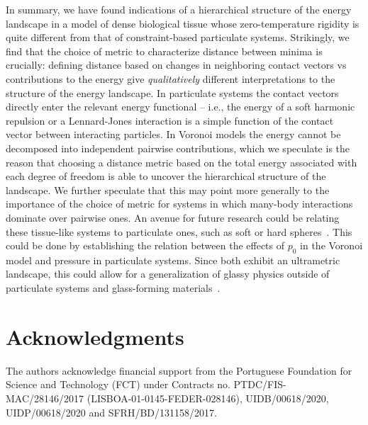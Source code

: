 \documentclass[reprint,amsmath,amssymb,aps]{revtex4-2}
\begin{document}
In summary, we have found indications of a hierarchical structure of the energy landscape in a model of dense biological tissue whose zero-temperature rigidity is quite different from that of constraint-based particulate systems. Strikingly, we find that the choice of metric to characterize distance between minima is crucially: defining distance based on changes in neighboring contact vectors vs contributions to the energy give \emph{qualitatively} different interpretations to the structure of the energy landscape. In particulate systems the contact vectors directly enter the relevant energy functional -- i.e., the energy of a soft harmonic repulsion or a Lennard-Jones interaction is a simple function of the contact vector between interacting particles. In Voronoi models the energy cannot be decomposed into independent pairwise contributions, which we speculate is the reason that choosing a distance metric based on the total energy associated with each degree of freedom is able to uncover the hierarchical structure of the landscape. We further speculate that this may point more generally to the importance of the choice of metric for systems in which many-body interactions dominate over pairwise ones. An avenue for future research could be relating these tissue-like systems to particulate ones, such as soft or hard spheres~\cite{Liao2019, Dennis2020}. This could be done by establishing the relation between the effects of $p_0$ in the Voronoi model and pressure in particulate systems. Since both exhibit an ultrametric landscape, this could allow for a generalization of glassy physics outside of particulate systems and glass-forming materials~\cite{Berthier2011, Parisi2010, Janssen2019}.


\section{Acknowledgments}

The authors acknowledge financial support from the Portuguese Foundation for
Science and Technology (FCT) under Contracts no. PTDC/FIS-MAC/28146/2017
(LISBOA-01-0145-FEDER-028146), UIDB/00618/2020, UIDP/00618/2020 and
SFRH/BD/131158/2017.

\end{document}
